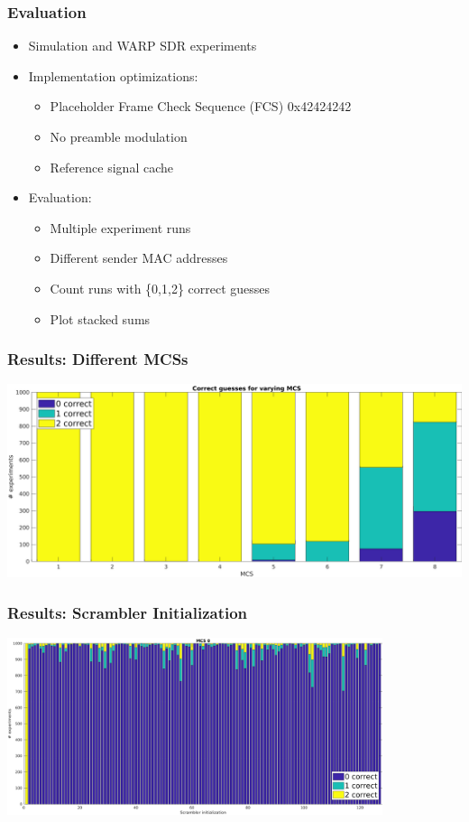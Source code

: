 \documentclass[accentcolor=tud8b,colorbacktitle]{tudbeamer}
\begin{document}
\begin{frame}
\frametitle{Evaluation}
\begin{itemize}
	\setlength\itemsep{1em}
	\item Simulation and WARP SDR experiments
	\item Implementation optimizations:
	\begin{itemize}
		\item Placeholder Frame Check Sequence (FCS) 0x42424242
		\item No preamble modulation
		\item Reference signal cache
	\end{itemize}
	\item Evaluation:
	\begin{itemize}
		\item Multiple experiment runs
		\item Different sender MAC addresses
		\item Count runs with \{0,1,2\} correct guesses
		\item Plot stacked sums
	\end{itemize}
\end{itemize}
\end{frame}


\begin{frame}
\frametitle{Results: Different MCSs}
\begin{centering}
	\includegraphics[width=\textwidth]{../../gfx/plots/mcs}\\
\end{centering}
\end{frame}


\begin{frame}
\frametitle{Results: Scrambler Initialization}
\begin{centering}
	\includegraphics[width=11cm]{../../gfx/plots/scrambler}\\
\end{centering}
\end{frame}
\end{document}
